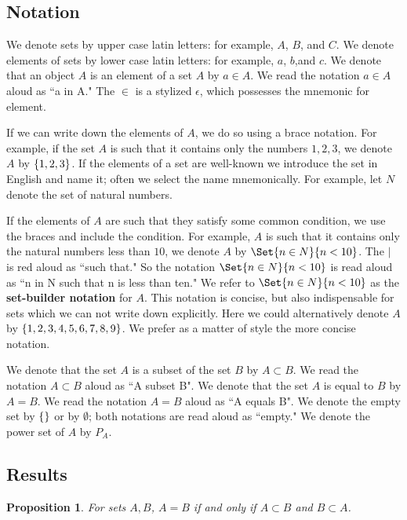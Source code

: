 \documentclass[18pt]{article}
\newcommand{\definition}[1]{\textbf{#1}}
\newcommand{\say}[1]{``#1"}
\DeclarePairedDelimiter{\set}{\{}{\}}
\newtheorem{prop}[thm]{Proposition}
\begin{document}
\subsection{Notation}

We denote sets by upper case latin letters: for example, $A$, $B$, and $C$.
We denote elements of sets by lower case latin letters: for example, $a$, $b$,and $c$.
We denote that an object $A$ is an element of a set $A$ by $a \in A$.
We read the notation $a \in A$ aloud as \say{a in A.}
The $\in$ is a stylized $\epsilon$, which possesses the mnemonic for element.

If we can write down the elements of $A$, we do so using a brace notation.
For example, if the set $A$ is such that it contains only the numbers $1, 2, 3$, we denote $A$ by $\set{1, 2, 3}$.
If the elements of a set are well-known we introduce the set in English and name it; often we select the name mnemonically.
For example, let $N$ denote the set of natural numbers.

If the elements of $A$ are such that they satisfy some common condition, we use the braces and include the condition.
For example, $A$ is such that it contains only the natural numbers less than $10$, we denote $A$ by $\Set{n \in N}{n < 10}$.
The $|$ is red aloud as \say{such that.}
So the notation $\Set{n \in N}{n < 10}$ is read aloud as \say{n in N such that n is less than ten.}
We refer to $\Set{n \in N}{n < 10}$ as the \definition{set-builder notation} for $A$.
This notation is concise, but also indispensable for sets which we can not write down explicitly.
Here we could alternatively denote $A$ by $\set{1, 2, 3, 4, 5, 6, 7, 8, 9}$.
We prefer as a matter of style the more concise notation.

We denote that the set $A$ is a subset of the set $B$ by $A \subset B$.
We read the notation $A \subset B$ aloud as \say{A subset B}.
We denote that the set $A$ is equal to $B$ by $A = B$.
We read the notation $A = B$ aloud as \say{A equals B}.
We denote the empty set by $\set{}$ or by $\emptyset$; both notations are read aloud as \say{empty.}
We denote the power set of $A$ by $P_A$.


\subsection{Results}

\begin{prop}
  For sets $A, B$, $A = B$ if and only if $A \subset B$ and $B \subset A$.
\end{prop}
\end{document}
